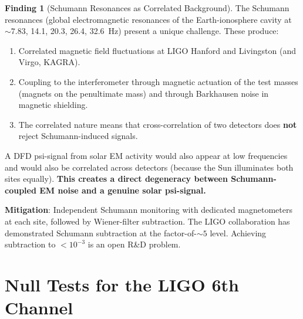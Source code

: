 \documentclass[11pt]{article}
\theoremstyle{definition}
\newtheorem{finding}[theorem]{Finding}
\theoremstyle{remark}
\begin{document}
\begin{finding}[Schumann Resonances as Correlated Background]
\label{find:schumann}
The Schumann resonances (global electromagnetic resonances of the
Earth-ionosphere cavity at $\sim 7.83$, 14.1, 20.3, 26.4, 32.6~Hz)
present a unique challenge. These produce:
\begin{enumerate}[nosep]
\item Correlated magnetic field fluctuations at LIGO Hanford and
  Livingston (and Virgo, KAGRA).
\item Coupling to the interferometer through magnetic actuation
  of the test masses (magnets on the penultimate mass) and through
  Barkhausen noise in magnetic shielding.
\item The correlated nature means that cross-correlation of two
  detectors does \textbf{not} reject Schumann-induced signals.
\end{enumerate}

A DFD psi-signal from solar EM activity would also appear at low
frequencies and would also be correlated across detectors (because the
Sun illuminates both sites equally). \textbf{This creates a direct
degeneracy between Schumann-coupled EM noise and a genuine solar
psi-signal.}

\textbf{Mitigation}: Independent Schumann monitoring with dedicated
magnetometers at each site, followed by Wiener-filter subtraction.
The LIGO collaboration has demonstrated Schumann subtraction at the
factor-of-$\sim 5$ level. Achieving subtraction to $<10^{-3}$ is
an open R\&D problem.
\end{finding}

\section{Null Tests for the LIGO 6th Channel}
\label{sec:null_tests}
\end{document}
